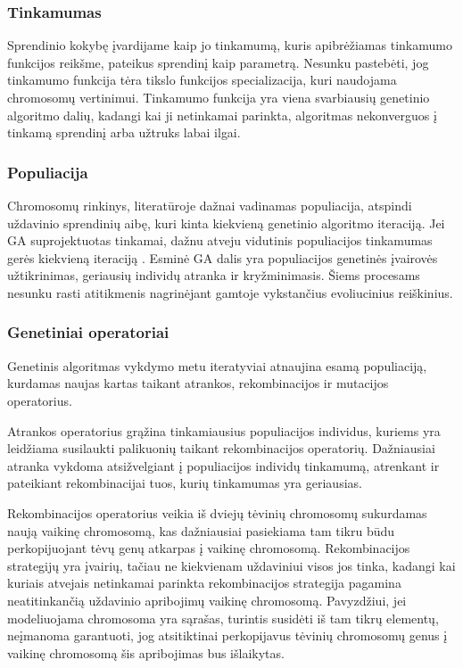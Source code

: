 \documentclass{VUMIFInfKursinis}
\begin{document}
\subsubsection{Tinkamumas}

Sprendinio kokybę įvardijame kaip jo tinkamumą, kuris apibrėžiamas tinkamumo funkcijos reikšme, pateikus sprendinį kaip parametrą.
Nesunku pastebėti, jog tinkamumo funkcija tėra tikslo funkcijos specializacija, kuri naudojama chromosomų vertinimui.
Tinkamumo funkcija yra viena svarbiausių genetinio algoritmo dalių,
kadangi kai ji netinkamai parinkta, algoritmas nekonverguos į tinkamą sprendinį arba užtruks labai ilgai.

\subsubsection{Populiacija}

Chromosomų rinkinys, literatūroje dažnai vadinamas populiacija, atspindi uždavinio sprendinių aibę, kuri kinta kiekvieną genetinio algoritmo iteraciją.
Jei GA suprojektuotas tinkamai, dažnu atveju vidutinis populiacijos tinkamumas gerės kiekvieną iteraciją \cite{simpson1999faster}.
Esminė GA dalis yra populiacijos genetinės įvairovės užtikrinimas, geriausių individų atranka ir kryžminimasis.
Šiems procesams nesunku rasti atitikmenis nagrinėjant gamtoje vykstančius evoliucinius reiškinius.

\subsubsection{Genetiniai operatoriai}

Genetinis algoritmas vykdymo metu iteratyviai atnaujina esamą populiaciją, kurdamas naujas kartas taikant atrankos, rekombinacijos ir mutacijos operatorius.


Atrankos operatorius grąžina tinkamiausius populiacijos individus, kuriems yra leidžiama susilaukti palikuonių taikant rekombinacijos operatorių.
Dažniausiai atranka vykdoma atsižvelgiant į populiacijos individų tinkamumą, atrenkant ir pateikiant rekombinacijai tuos, kurių tinkamumas yra geriausias.


Rekombinacijos operatorius veikia iš dviejų tėvinių chromosomų sukurdamas naują vaikinę chromosomą, kas dažniausiai pasiekiama
tam tikru būdu perkopijuojant tėvų genų atkarpas į vaikinę chromosomą.
Rekombinacijos strategijų yra įvairių, tačiau ne kiekvienam uždaviniui visos jos tinka, kadangi
kai kuriais atvejais netinkamai parinkta rekombinacijos strategija pagamina neatitinkančią uždavinio apribojimų vaikinę chromosomą.
Pavyzdžiui, jei modeliuojama chromosoma yra sąrašas, turintis susidėti iš tam tikrų elementų, neįmanoma garantuoti, jog atsitiktinai
perkopijavus tėvinių chromosomų genus į vaikinę chromosomą šis apribojimas bus išlaikytas.
\end{document}

